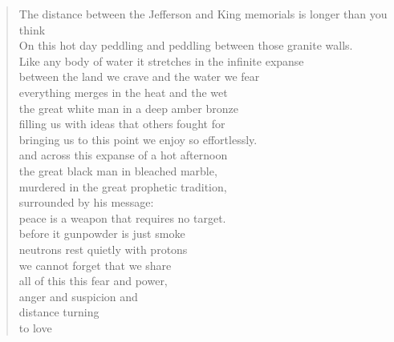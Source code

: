 \begin{verse}
The distance between the Jefferson and King memorials is longer than you think \\
On this hot day peddling and peddling between those granite walls. \\
Like any body of water it stretches in the infinite expanse \\
between the land we crave and the water we fear \\
everything merges in the heat and the wet \\
the great white man in a deep amber bronze  \\
filling us with ideas that others fought for \\
bringing us to this point we enjoy so effortlessly. \\
and across this expanse of a hot afternoon \\
the great black man in bleached marble, \\
murdered in the great prophetic tradition, \\
surrounded by his message: \\
peace is a weapon that requires no target. \\
before it gunpowder is just smoke \\
neutrons rest quietly with protons \\
we cannot forget that we share  \\
all of this this fear and power,  \\
anger and suspicion and \\
distance turning \\
to love
\end{verse}
